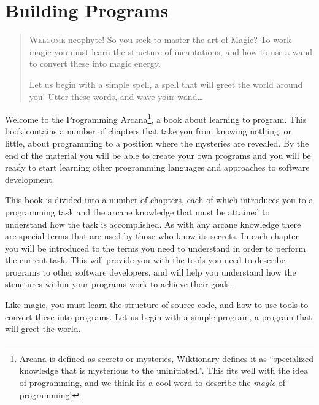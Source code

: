 \chapter{Building Programs} %
\label{cha:building programs}

\begin{quote}
  \Fontlukas\Large
  \renewcommand{\LettrineTextFont}{\relax}
  \renewcommand{\LettrineFontHook}{\color{red}}
  \lettrine[image=true,lines=3,lhang=.2, loversize=.25, findent=0.1em]
  {W}{elcome} neophyte! So you seek to master the art of Magic? To work magic you must learn the structure of incantations, and how to use a wand to convert these into magic energy. 
  
  Let us begin with a simple spell, a spell that will greet the world around you! Utter these words, and wave your wand\ldots
\end{quote}

\bigskip

Welcome to the Programming Arcana\footnote{Arcana is defined as secrets or mysteries, Wiktionary defines it as ``specialized knowledge that is mysterious to the uninitiated.''. This fits well with the idea of programming, and we think its a cool word to describe the \emph{magic} of programming!}, a book about learning to program. This book contains a number of chapters that take you from knowing nothing, or little, about programming to a position where the mysteries are revealed. By the end of the material you will be able to create your own programs and you will be ready to start learning other programming languages and approaches to software development.

This book is divided into a number of chapters, each of which introduces you to a programming task and the arcane knowledge that must be attained to understand how the task is accomplished. As with any arcane knowledge there are special terms that are used by those who know its secrets. In each chapter you will be introduced to the terms you need to understand in order to perform the current task. This will provide you with the tools you need to describe programs to other software developers, and will help you understand how the structures within your programs work to achieve their goals.

Like magic, you must learn the structure of source code, and how to use tools to convert these into programs. Let us begin with a simple program, a program that will greet the world.

\minitoc

